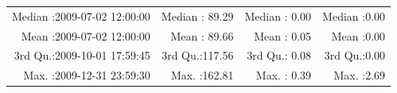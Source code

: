 \documentclass[
  10pt,
  a4paper,oneside]{article}
\begin{document}
\begin{longtable}[]{@{}rrrr@{}}
\begin{minipage}[t]{0.34\columnwidth}
Median :2009-07-02 12:00:00\strut
\end{minipage} & \begin{minipage}[t]{0.19\columnwidth}\raggedleft
Median : 89.29\strut
\end{minipage} & \begin{minipage}[t]{0.18\columnwidth}\raggedleft
Median : 0.00\strut
\end{minipage} & \begin{minipage}[t]{0.18\columnwidth}\raggedleft
Median :0.00\strut
\end{minipage}\tabularnewline
\begin{minipage}[t]{0.34\columnwidth}\raggedleft
Mean :2009-07-02 12:00:00\strut
\end{minipage} & \begin{minipage}[t]{0.19\columnwidth}\raggedleft
Mean : 89.66\strut
\end{minipage} & \begin{minipage}[t]{0.18\columnwidth}\raggedleft
Mean : 0.05\strut
\end{minipage} & \begin{minipage}[t]{0.18\columnwidth}\raggedleft
Mean :0.00\strut
\end{minipage}\tabularnewline
\begin{minipage}[t]{0.34\columnwidth}\raggedleft
3rd Qu.:2009-10-01 17:59:45\strut
\end{minipage} & \begin{minipage}[t]{0.19\columnwidth}\raggedleft
3rd Qu.:117.56\strut
\end{minipage} & \begin{minipage}[t]{0.18\columnwidth}\raggedleft
3rd Qu.: 0.08\strut
\end{minipage} & \begin{minipage}[t]{0.18\columnwidth}\raggedleft
3rd Qu.:0.00\strut
\end{minipage}\tabularnewline
\begin{minipage}[t]{0.34\columnwidth}\raggedleft
Max. :2009-12-31 23:59:30\strut
\end{minipage} & \begin{minipage}[t]{0.19\columnwidth}\raggedleft
Max. :162.81\strut
\end{minipage} & \begin{minipage}[t]{0.18\columnwidth}\raggedleft
Max. : 0.39\strut
\end{minipage} & \begin{minipage}[t]{0.18\columnwidth}\raggedleft
Max. :2.69\strut
\end{minipage}\tabularnewline

\end{longtable}
\end{document}
